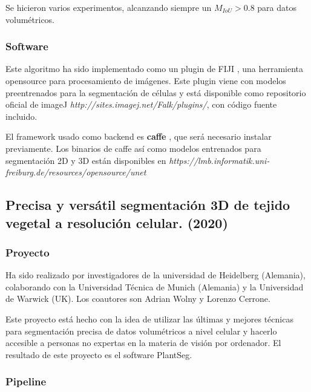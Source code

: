 Se hicieron varios experimentos, alcanzando siempre un $M_{IoU}>0.8$ para datos volumétricos.

\subsubsection{Software}

Este algoritmo ha sido implementado como un plugin de FIJI \cite{Schindelin2012}, una herramienta opensource para procesamiento de imágenes. Este plugin viene con modelos preentrenados para la segmentación de células y está disponible como repositorio oficial de imageJ \textit{http://sites.imagej.net/Falk/plugins/}, con código fuente incluido.

El framework usado como backend es \textbf{caffe} \cite{Jia2014}, que será necesario instalar previamente. Los binarios de caffe así como modelos entrenados para segmentación 2D y 3D están disponibles en \textit{https://lmb.informatik.uni-freiburg.de/resources/opensource/unet}

\subsection{Precisa y versátil segmentación 3D de tejido vegetal a resolución celular. (2020)}


\subsubsection{Proyecto}

Ha sido realizado por investigadores de la universidad de Heidelberg (Alemania), colaborando con la Universidad Técnica de Munich (Alemania) y la Universidad de Warwick (UK). Los coautores son Adrian Wolny y Lorenzo Cerrone.\cite{Wolny2020}

Este proyecto está hecho con la idea de utilizar las últimas y mejores técnicas para segmentación precisa de datos volumétricos a nivel celular y hacerlo accesible a personas no expertas en la materia de visión por ordenador. El resultado de este proyecto es el software PlantSeg.

\subsubsection{Pipeline}

